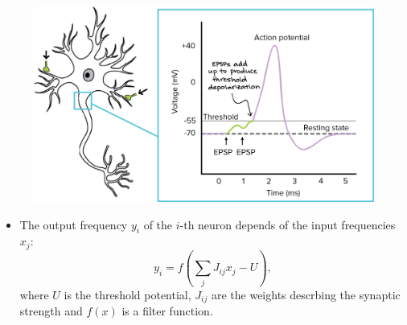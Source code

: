\documentclass[12pt]{article}
\numberwithin{equation}{section}
\begin{document}
\newpage
\begin{figure}[h!]
    \centering
    \includegraphics[height=0.6\textheight]{images/synapse-threshold.png}
\end{figure}
\begin{itemize}
    \item The output frequency $y_i$ of the $i$-th neuron depends of the input frequencies $x_j$:
    \begin{equation*}
        y_i = f\left(\sum\limits_{j}J_{ij}x_j - U\right),
    \end{equation*}
    where $U$ is the threshold potential, $J_{ij}$ are the weights descrbing the synaptic strength and 
    $f(x)$ is a filter function. 
\end{itemize}
\end{document}
